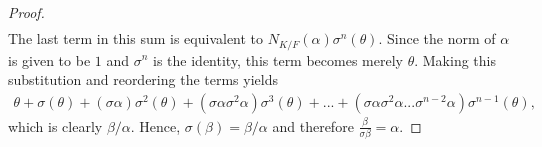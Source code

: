 \documentclass[10pt]{article}
\newenvironment{problem}[2][Problem]{\begin{trivlist}
		\item[\hskip \labelsep {\bfseries #1}\hskip \labelsep {\bfseries #2.}]}{\end{trivlist}}
\begin{document}
\begin{problem}{2.23}
\begin{proof}
\begin{align*}
			\end{align*}
			The last term in this sum is equivalent to $N_{K/F}(\alpha)\sigma^n(\theta)$. Since the norm of $\alpha$ is given to be $1$ and $\sigma^n$ is the identity, this term becomes merely $\theta$. Making this substitution and reordering the terms yields
			\begin{align*}
				\theta + \sigma(\theta) + (\sigma\alpha)\sigma^2(\theta) + (\sigma\alpha\sigma^2\alpha)\sigma^3(\theta) + ... + (\sigma\alpha\sigma^2\alpha...\sigma^{n-2}\alpha)\sigma^{n-1}(\theta),
			\end{align*}
			which is clearly $\beta/\alpha$. Hence, $\sigma(\beta) = \beta/\alpha$ and therefore $\frac{\beta}{\sigma\beta} = \alpha$.
		\end{proof}
	\end{problem}
\end{document}
